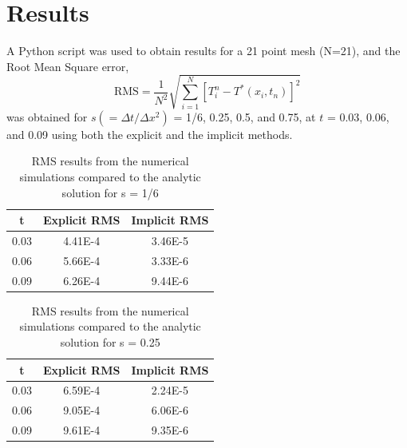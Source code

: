 \documentclass[twocolumn,10pt]{asme2ej}
\begin{document}
\section{Results}

A Python script was used to obtain results for a 21 point mesh (N=21), and the Root Mean Square error,
\begin{equation}
\mbox{RMS} = \frac{1}{N^2}\sqrt{\sum\limits_{i=1}^N[T_i^n - T^*(x_i, t_n)]^2}
\end{equation}
was obtained for $s(=\Delta t/ \Delta x^2)$ = 1/6, 0.25, 0.5, and 0.75, at $t$ = 0.03, 0.06, and 0.09 using both the explicit and the implicit methods.

\begin{table}[h]
\begin{center}
\label{table_ASME}
\begin{tabular}{|c | c c|}
\hline
t & Explicit RMS & Implicit RMS \\
\hline
0.03 & 4.41E-4 & 3.46E-5\\
0.06 & 5.66E-4 & 3.33E-6\\
0.09 & 6.26E-4 & 9.44E-6\\
\hline
\end{tabular}
\caption{RMS results from the numerical simulations compared to the analytic solution for s = 1/6}
\end{center}
\end{table}

\begin{table}[h]
\begin{center}
\label{table_ASME}
\begin{tabular}{|c | c c|}
\hline
t & Explicit RMS & Implicit RMS \\
\hline
0.03 & 6.59E-4 & 2.24E-5\\
0.06 & 9.05E-4 & 6.06E-6\\
0.09 & 9.61E-4 & 9.35E-6\\
\hline
\end{tabular}
\caption{RMS results from the numerical simulations compared to the analytic solution for s = 0.25}
\end{center}
\end{table}
\end{document}
